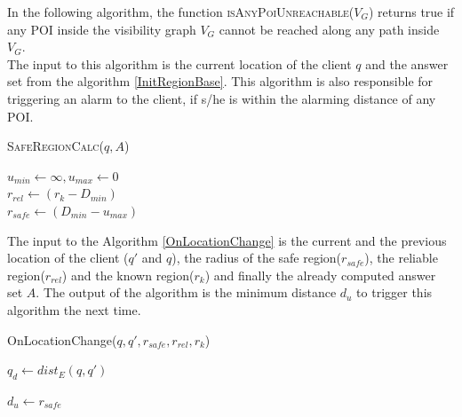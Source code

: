\documentclass{sig-alternate}
\begin{document}
In the following algorithm, the function \textsc{isAnyPoiUnreachable}($V_G$) returns true if any POI inside the visibility graph $V_G$ cannot be reached along any path inside $V_G$. \\
The input to this algorithm is the current location of the client $q$ and the answer set from the algorithm \ref{InitRegionBase}. This algorithm is also responsible for triggering an alarm to the client, if s/he is within the alarming distance of any POI.

\begin{algorithm}
\caption{\textsc{SafeRegionCalc}($q ,A$)}
\label{SafeRegionCalc}
    
	
	 $u_{min} \gets \infty, u_{max} \gets 0$ \\
	 $r_{rel} \gets ( r_k - D_{min} )$\\
	 \Return $r_{safe} \gets (D_{min} - u_{max})$ 
\end{algorithm}

The input to the Algorithm \ref{OnLocationChange} is the current and the previous location of the client ($q'$ and $q$), the radius of the safe region($r_{safe}$), the reliable region($r_{rel}$) and the known region($r_{k}$) and finally the already computed answer set $A$. The output of the algorithm is the minimum distance $d_u$ to trigger this algorithm the next time.

\begin{algorithm}
\caption{OnLocationChange($q, q', r_{safe}, r_{rel}, r_k$)}
\label{OnLocationChange}
    
    $q_d \gets dist_E(q, q')$
    
    
    \Return $d_u \gets r_{safe}$
\end{algorithm}
\end{document}
